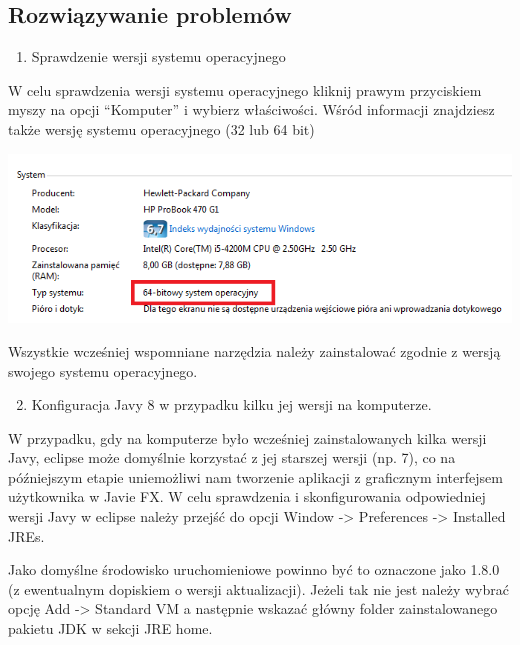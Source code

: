 \documentclass[letterpaper,10pt,english]{sphinxmanual}
\begin{document}
\subsection{Rozwiązywanie problemów}
\label{config:rozwiazywanie-problemow}\begin{enumerate}
\item {} 
Sprawdzenie wersji systemu operacyjnego

\end{enumerate}

W celu sprawdzenia wersji systemu operacyjnego kliknij prawym przyciskiem myszy na opcji ``Komputer'' i wybierz właściwości. Wśród informacji znajdziesz także wersję systemu operacyjnego (32 lub 64 bit)

\includegraphics{bit.png}

Wszystkie wcześniej wspomniane narzędzia należy zainstalować zgodnie z wersją swojego systemu operacyjnego.
\begin{enumerate}
\setcounter{enumi}{1}
\item {} 
Konfiguracja Javy 8 w przypadku kilku jej wersji na komputerze.

\end{enumerate}

W przypadku, gdy na komputerze było wcześniej zainstalowanych kilka wersji Javy, eclipse może domyślnie korzystać z jej starszej wersji (np. 7), co na późniejszym etapie uniemożliwi nam tworzenie aplikacji z graficznym interfejsem użytkownika w Javie FX. W celu sprawdzenia i skonfigurowania odpowiedniej wersji Javy w eclipse należy przejść do opcji Window -\textgreater{} Preferences -\textgreater{} Installed JREs.

Jako domyślne środowisko uruchomieniowe powinno być to oznaczone jako 1.8.0 (z ewentualnym dopiskiem o wersji aktualizacji). Jeżeli tak nie jest należy wybrać opcję Add -\textgreater{} Standard VM a następnie wskazać główny folder zainstalowanego pakietu JDK w sekcji JRE home.
\end{document}
